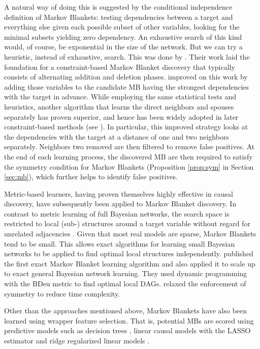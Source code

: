 \documentclass{svmult}
\begin{document}
A natural way of doing this is suggested by the conditional
independence definition of Markov Blankets: testing dependencies
between a target and everything else given each possible subset of
other variables, looking for the minimal subsets yielding zero
dependency. An exhaustive search of this kind would, of course, be
exponential in the size of the network. But we can try a heuristic,
instead of exhaustive, search. This was done by
\citet{margaritis1999bayesian}. Their work laid the foundation for a
constraint-based Markov Blanket discovery that typically consists of
alternating addition and deletion
phases. \citet{tsamardinos2003algorithms} improved on this work by
adding those variables to the candidate MB having the strongest
dependencies with the target in advance. While employing the same
statistical tests and heuristics, another algorithm that learns the
direct neighbors and spouses separately has proven superior, and hence
has been widely adopted in later constraint-based methods (see
\citet{aliferis2003hiton,tsamardinos2003time,pena2007towards,fu2008fast,aliferis2010locala,demorais2010novel,liu2016swamping}). In
particular, this improved strategy looks at the dependencies with the
target at a distance of one and two neighbors separately.  Neighbors
two removed are then filtered to remove false positives. At the end of
each learning process, the discovered MB are then required
to satisfy the symmetry condition for Markov Blankets (Proposition
\ref{prop:sym} in Section \ref{sec:mb}), which further helps to
identify false positives.

Metric-based learners, having proven themselves highly effective in
causal discovery, have subsequently been applied to Markov Blanket
discovery. In contrast to metric learning of full Bayesian networks,
the search space is restricted to local (sub-) structures around a
target variable without regard for unrelated adjacencies
\citep{cooper1997evaluation,madden2002new,acid2013score}. Given that
most real models are sparse, Markov Blankets tend to be small. This
allows exact algorithms for learning small Bayesian networks to be
applied to find optimal local structures
independently. \citet{niinimaki2012local} published the first exact
Markov Blanket learning algorithm and also applied it to scale up to
exact general Bayesian network learning. They used dynamic programming
with the BDeu metric to find optimal local
DAGs. \citet{gao2017efficient} relaxed the enforcement of symmetry to
reduce time complexity.

Other than the approaches mentioned above, Markov Blankets have also
been learned using wrapper feature selection. That is, potential MBs
are scored using predictive models such as decision trees
\citep{frey2003identifying}, linear causal models with the LASSO
estimator \citep{li2004} and ridge regularized linear models
\citep{strobl2016markov}.
\end{document}
